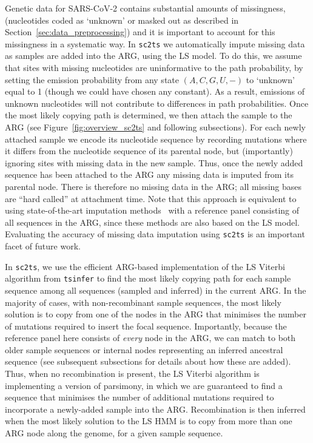 \documentclass{article}
\begin{document}
Genetic data for SARS-CoV-2 contains substantial amounts of missingness,
(nucleotides coded as `unknown' or masked out
as described in Section~\ref{sec:data_preprocessing})
and it is important to account for this missingness in a systematic way.
In \texttt{sc2ts} we automatically impute missing data as samples are added
into the ARG, using the LS model.
To do this, we assume that sites with missing nucleotides are uninformative
to the path probability, by setting the emission probability from any
state $(A,C,G,U,-)$ to `unknown' equal to 1 (though we could have chosen any constant).
As a result, emissions of unknown nucleotides will not contribute to
differences in path probabilities.
Once the most likely copying path is determined, we then attach the
sample to the ARG (see Figure~\ref{fig:overview_sc2ts} and following subsections).
For each newly attached sample we encode its nucleotide sequence by
recording mutations where it differs from the nucleotide sequence
of its parental node, but (importantly) ignoring sites with missing data
in the new sample.
Thus, once the newly added sequence has been attached to the ARG
any missing data is imputed from its parental node. There is therefore
no missing data in the ARG; all missing bases are ``hard called''
at attachment time.
Note that this approach is equivalent to
using state-of-the-art imputation
methods~\citep[e.g.][]{Browning2018-nk,Delaneau2019-wl} with a reference
panel consisting of all sequences in the ARG,
since these methods are also based on the LS model.
Evaluating the accuracy of missing data imputation
using \texttt{sc2ts} is an important facet of future work.

In \texttt{sc2ts}, we use the efficient ARG-based implementation of the
LS Viterbi algorithm from \texttt{tsinfer} \citep{Kelleher2019-ba} to find
the most likely copying path for each sample sequence
among all sequences (sampled and inferred) in the current ARG.
In the majority of cases, with non-recombinant sample sequences,
the most likely solution is to copy from one
of the nodes in the ARG that minimises the number of mutations required
to insert the focal sequence. Importantly, because the reference panel here consists of
\emph{every} node in the ARG, we can match to both older sample
sequences or internal nodes representing an inferred ancestral sequence
(see subsequent subsections for details about how these are added).
Thus, when no recombination is present, the LS Viterbi algorithm is
implementing a version of parsimony, in which we are guaranteed to
find a sequence that minimises the number of additional mutations required
to incorporate a newly-added sample into the ARG.
Recombination is then inferred when the most likely solution to the LS
HMM is to copy from more than one ARG node along the genome, for a
given sample sequence.
\end{document}

